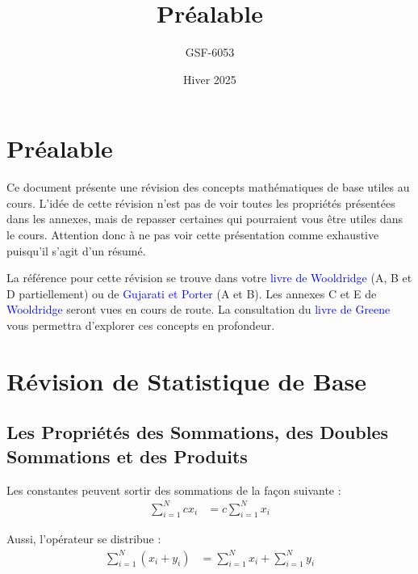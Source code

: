 \documentclass[14pt]{extarticle} %
\title{\textbf{Préalable}}
\author{GSF-6053}
\date{Hiver 2025}
\newcommand{\livre}[1]{\textcolor{blue}{#1}}
\begin{document}
\maketitle
\tableofcontents
\newpage

\onehalfspacing

\section{Préalable}

Ce document présente une révision des concepts mathématiques de base utiles au cours. 
L’idée de cette révision n’est pas de voir toutes les propriétés présentées dans les annexes, 
mais de repasser certaines qui pourraient vous être utiles dans le cours. Attention donc à ne 
pas voir cette présentation comme exhaustive puisqu’il s’agit d’un résumé.

La référence pour cette révision se trouve dans votre \livre{livre de Wooldridge} (A, B et D partiellement) 
ou de \livre{Gujarati et Porter} (A et B). Les annexes C et E de \livre{Wooldridge} seront vues en cours de route. 
La consultation du \livre{livre de Greene} vous permettra d’explorer ces concepts en profondeur.

\section{Révision de Statistique de Base}

\subsection{Les Propriétés des Sommations, des Doubles Sommations et des Produits}

Les constantes peuvent sortir des sommations de la façon suivante :
\begin{align*}
    \sum_{i=1}^{N} c x_i &= c \sum_{i=1}^{N} x_i
\end{align*}

Aussi, l’opérateur se distribue :
\begin{align*}
    \sum_{i=1}^{N} (x_i + y_i) &= \sum_{i=1}^{N} x_i + \sum_{i=1}^{N} y_i
\end{align*}
\end{document}
